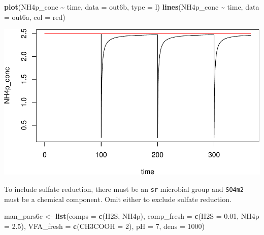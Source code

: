 \documentclass[
]{article}
\newenvironment{Shaded}{\begin{snugshade}}{\end{snugshade}}
\newcommand{\AttributeTok}[1]{\textcolor[rgb]{0.13,0.29,0.53}{#1}}
\newcommand{\DecValTok}[1]{\textcolor[rgb]{0.00,0.00,0.81}{#1}}
\newcommand{\FloatTok}[1]{\textcolor[rgb]{0.00,0.00,0.81}{#1}}
\newcommand{\FunctionTok}[1]{\textcolor[rgb]{0.13,0.29,0.53}{\textbf{#1}}}
\newcommand{\NormalTok}[1]{#1}
\newcommand{\OtherTok}[1]{\textcolor[rgb]{0.56,0.35,0.01}{#1}}
\newcommand{\SpecialCharTok}[1]{\textcolor[rgb]{0.81,0.36,0.00}{\textbf{#1}}}
\newcommand{\StringTok}[1]{\textcolor[rgb]{0.31,0.60,0.02}{#1}}
\begin{document}
\begin{Shaded}
\begin{Highlighting}[]
\FunctionTok{plot}\NormalTok{(NH4p\_conc }\SpecialCharTok{\textasciitilde{}}\NormalTok{ time, }\AttributeTok{data =}\NormalTok{ out6b, }\AttributeTok{type =} \StringTok{\textquotesingle{}l\textquotesingle{}}\NormalTok{)}
\FunctionTok{lines}\NormalTok{(NH4p\_conc }\SpecialCharTok{\textasciitilde{}}\NormalTok{ time, }\AttributeTok{data =}\NormalTok{ out6a, }\AttributeTok{col =} \StringTok{\textquotesingle{}red\textquotesingle{}}\NormalTok{)}
\end{Highlighting}
\end{Shaded}

\includegraphics{simple_demo_files/figure-latex/unnamed-chunk-45-1.pdf}

To include sulfate reduction, there must be an \texttt{sr} microbial
group and \texttt{SO4m2} must be a chemical component. Omit either to
exclude sulfate reduction.

\begin{Shaded}
\begin{Highlighting}[]
\NormalTok{man\_pars6c }\OtherTok{\textless{}{-}} \FunctionTok{list}\NormalTok{(}\AttributeTok{comps =} \FunctionTok{c}\NormalTok{(}\StringTok{\textquotesingle{}H2S\textquotesingle{}}\NormalTok{, }\StringTok{\textquotesingle{}NH4p\textquotesingle{}}\NormalTok{),}
                 \AttributeTok{comp\_fresh =} \FunctionTok{c}\NormalTok{(}\AttributeTok{H2S =} \FloatTok{0.01}\NormalTok{, }\AttributeTok{NH4p =} \FloatTok{2.5}\NormalTok{), }
                 \AttributeTok{VFA\_fresh =} \FunctionTok{c}\NormalTok{(}\AttributeTok{CH3COOH =} \DecValTok{2}\NormalTok{),}
                 \AttributeTok{pH =} \DecValTok{7}\NormalTok{, }\AttributeTok{dens =} \DecValTok{1000}\NormalTok{)}
\end{Highlighting}
\end{Shaded}
\end{document}
